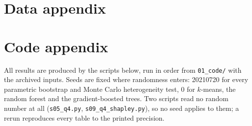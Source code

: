 \section{Data appendix}\label{app:data}



\section{Code appendix}\label{app:code}

All results are produced by the scripts below, run in order from \texttt{01\_code/} with the archived inputs. Seeds are fixed where randomness enters: 20210720 for every parametric bootstrap and Monte Carlo heterogeneity test, 0 for $k$-means, the random forest and the gradient-boosted trees. Two scripts read no random number at all (\texttt{s05\_q4.py}, \texttt{s09\_q4\_shapley.py}), so no seed applies to them; a rerun reproduces every table to the printed precision.


